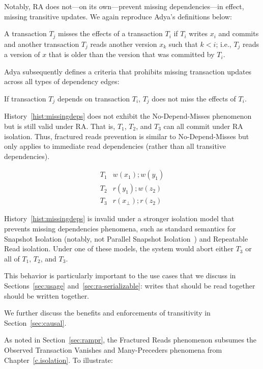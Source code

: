  Notably, RA does not---on its
own---prevent missing dependencies---in effect, missing transitive
updates. We again reproduce Adya's definitions below:

\begin{definition}
A transaction $T_j$ misses the effects of a transaction $T_i$ if $T_i$
writes $x_i$ and commits and another transaction $T_j$ reads another
version $x_k$ such that $k < i$; i.e., $T_j$ reads a version of $x$
that is older than the version that was committed by $T_i$.
\end{definition}

Adya subsequently defines a criteria that prohibits missing
transaction updates across all types of dependency edges:

\begin{definition}
If transaction $T_j$ depends on transaction $T_i$, $T_j$ does not miss
the effects of $T_i$.
\end{definition}

History~\ref{hist:missingdeps} does not exhibit the No-Depend-Misses
phenomenon but is still valid under RA. That is, $T_1$, $T_2$, and
$T_3$ can all commit under RA isolation. Thus, fractured reads
prevention is similar to No-Depend-Misses but only applies to
immediate read dependencies (rather than all transitive dependencies).

\begin{eqnarray}
\label{hist:missingdeps}
T_1 & w(x_1); w(y_1)\\
T_2 & r(y_1); w(z_2)\nonumber\\
T_3 & r(x_\bot); r(z_2) \nonumber
\end{eqnarray}

History~\ref{hist:missingdeps} is invalid under a stronger isolation
model that prevents missing dependencies phenomena, such as standard
semantics for Snapshot Isolation (notably, not Parallel Snapshot
Isolation~\cite{walter}) and Repeatable Read isolation. Under one of
these models, the system would abort either $T_3$ or all of $T_1$,
$T_2$, and $T_3$.

This behavior is particularly important to the use cases that we
discuss in Sections~\ref{sec:usage} and~\ref{sec:ra-serializable}:
writes that should be read together should be written together.

We further discuss the benefits and enforcements of transitivity in
Section~\ref{sec:causal}.

 As noted in
Section~\ref{sec:rampr}, the Fractured Reads phenomenon subsumes
the Observed Transaction Vanishes and Many-Preceders phenomena from
Chapter~\ref{c.isolation}. To illustrate:

